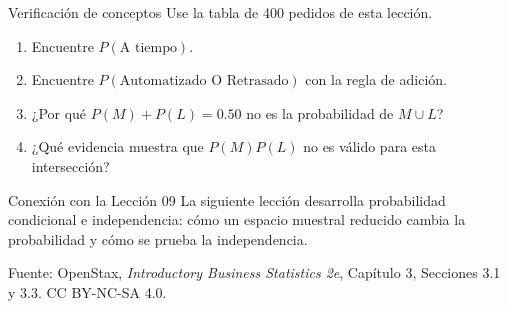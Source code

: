 \documentclass[aspectratio=169,10pt,spanish]{beamer}
\begin{document}
\begin{frame}{Verificación de conceptos}
  Use la tabla de 400 pedidos de esta lección.
  \begin{enumerate}
    \item Encuentre \(P(\text{A tiempo})\).
    \item Encuentre \(P(\text{Automatizado O Retrasado})\) con la regla de
      adición.
    \item ¿Por qué \(P(M)+P(L)=0.50\) no es la probabilidad de \(M\cup L\)?
    \item ¿Qué evidencia muestra que \(P(M)P(L)\) no es válido para esta
      intersección?
  \end{enumerate}

  \vspace{0.4em}
  \begin{block}{Conexión con la Lección 09}
    La siguiente lección desarrolla probabilidad condicional e independencia:
    cómo un espacio muestral reducido cambia la probabilidad y cómo se prueba
    la independencia.
  \end{block}

  \vfill
  \scriptsize Fuente: OpenStax, \textit{Introductory Business Statistics 2e},
  Capítulo 3, Secciones 3.1 y 3.3. CC BY-NC-SA 4.0.
\end{frame}

\appendix
\end{document}

